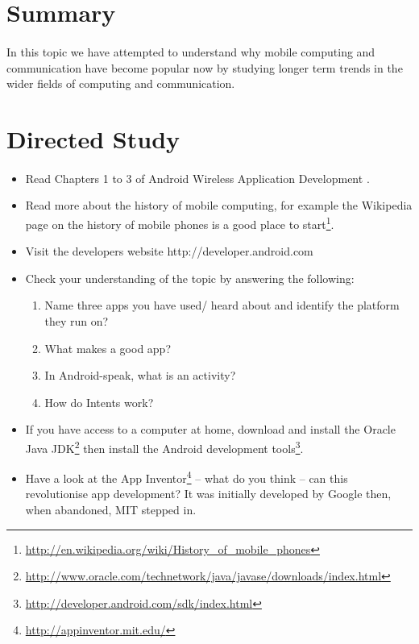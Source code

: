 \documentclass[12pt, a4paper, twoside]{book}
\begin{document}
\section{Summary}
\paragraph{} In this topic we have attempted to understand why mobile computing and communication have become popular now by studying longer term trends in the wider fields of computing and communication.

\section{Directed Study}
\paragraph{} 

\begin{itemize}
\item Read Chapters 1 to 3 of Android Wireless Application Development \cite{conder_2010_android_ebook}.
\item Read more about the history of mobile computing, for example the Wikipedia page on the history of mobile phones is a good place to start\footnote{\url{http://en.wikipedia.org/wiki/History_of_mobile_phones}}.
\item Visit the developers website http://developer.android.com
\item Check your understanding of the topic by answering the following:
\begin{enumerate}
\item Name three apps you have used/ heard about and identify the platform they run on?
\item What makes a good app?
\item In Android-speak, what is an activity?
\item How do Intents work?
\end{enumerate}
\item If you have access to a computer at home, download and install the Oracle Java JDK\footnote{\url{http://www.oracle.com/technetwork/java/javase/downloads/index.html}} then install the Android development tools\footnote{\url{http://developer.android.com/sdk/index.html}}.
\item Have a look at the App Inventor\footnote{\url{http://appinventor.mit.edu/}}  – what do you think – can this revolutionise app development? It was initially developed by Google then, when abandoned, MIT stepped in.
\end{itemize}
\end{document}
